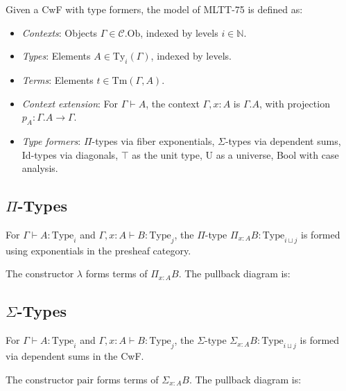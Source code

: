 \documentclass{article}
\begin{document}
\begin{definition}
Given a CwF with type formers, the model of MLTT-75 is defined as:
\begin{itemize}
  \item \emph{Contexts}: Objects $\Gamma \in \mathcal{C}.\text{Ob}$, indexed by levels $i \in \mathbb{N}$.
  \item \emph{Types}: Elements $A \in \text{Ty}_i(\Gamma)$, indexed by levels.
  \item \emph{Terms}: Elements $t \in \text{Tm}(\Gamma, A)$.
  \item \emph{Context extension}: For $\Gamma \vdash A$, the context $\Gamma, x : A$ is $\Gamma.A$, with projection $p_A : \Gamma.A \to \Gamma$.
  \item \emph{Type formers}: $\Pi$-types via fiber exponentials, $\Sigma$-types via dependent sums, Id-types via diagonals, $\top$ as the unit type, U as a universe, Bool with case analysis.
\end{itemize}
\end{definition}

\subsection{$\Pi$-Types}
For $\Gamma \vdash A : \text{Type}_i$ and $\Gamma, x : A \vdash B : \text{Type}_j$, the $\Pi$-type $\Pi_{x : A} B : \text{Type}_{i \sqcup j}$ is formed using exponentials in the presheaf category.

The constructor $\lambda$ forms terms of $\Pi_{x : A} B$. The pullback diagram is:


\subsection{$\Sigma$-Types}
For $\Gamma \vdash A : \text{Type}_i$ and $\Gamma, x : A \vdash B : \text{Type}_j$, the $\Sigma$-type $\Sigma_{x : A} B : \text{Type}_{i \sqcup j}$ is formed via dependent sums in the CwF.

The constructor $\text{pair}$ forms terms of $\Sigma_{x : A} B$. The pullback diagram is:
\end{document}
